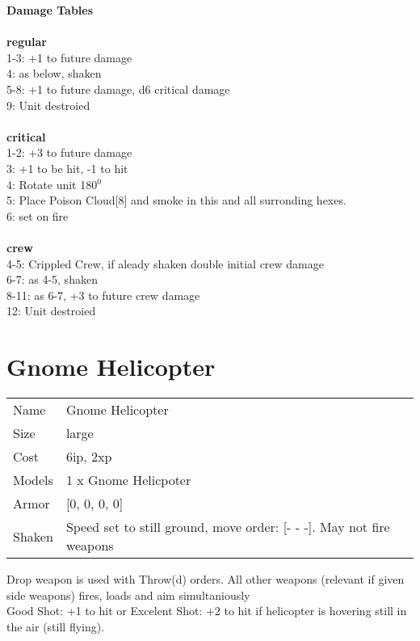 {\bf Damage Tables} \\
\ \\ {\bf regular } \\
1-3: +1 to future damage \\
4: as below, shaken \\
5-8: +1 to future damage, d6 critical damage \\
9: Unit destroied \\
\ \\ {\bf critical } \\
1-2: +3 to future damage \\
3: +1 to be hit, -1 to hit \\
4: Rotate unit 180$^0$ \\
5: Place Poison Cloud[8] and smoke in this and all surronding hexes. \\
6: set on fire \\
\ \\ {\bf crew } \\
4-5: Crippled Crew, if aleady shaken double initial crew damage \\
6-7: as 4-5, shaken \\
8-11: as 6-7, +3 to future crew damage \\
12: Unit destroied \\










\pagebreak\pagebreak

\section{ Gnome Helicopter }

\begin{tabular}{ll}
  Name & Gnome Helicopter \\
  Size & large\\
  Cost & 6ip, 2xp\\
  Models & 1 x Gnome Helicpoter\\
  Armor & [0, 0, 0, 0]\\
  Shaken & Speed set to still ground, move order: [- - -]. May not fire weapons\\
\end{tabular}

\noindent Drop weapon is used with Throw(d) orders. All other weapons (relevant if given side weapons) fires, loads and aim simultaniously\\ 
Good Shot: +1 to hit or Excelent Shot: +2 to hit if helicopter is hovering still in the air (still flying).\\ 


